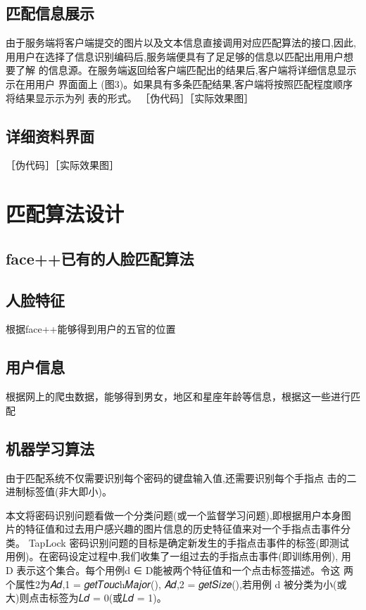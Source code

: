 \subsection{匹配信息展⽰}
由于服务端将客户端提交的图片以及文本信息直接调用对应匹配算法的接口,因此, ⽤用户在选择了信息识别编码后,服务端便具有了⾜足够的信息以匹配出⽤用户想要了解 的信息源。在服务端返回给客户端匹配出的结果后,客户端将详细信息显⽰示在⽤用户 界⾯面上 (图3)。如果具有多条匹配结果,客户端将按照匹配程度顺序将结果显⽰示为列 表的形式。
［伪代码］［实际效果图］
\subsection{详细资料界面}
［伪代码］［实际效果图］


\section{}

\section{匹配算法设计}
\subsection{face++已有的人脸匹配算法}
\subsection{人脸特征}
根据face++能够得到用户的五官的位置
\subsection{用户信息}
根据网上的爬虫数据，能够得到男女，地区和星座年龄等信息，根据这一些进行匹配
\subsection{机器学习算法}
由于匹配系统不仅需要识别每个密码的键盘输入值,还需要识别每个手指点 击的二进制标签值(非大即小)。

本文将密码识别问题看做一个分类问题(或一个监督学习问题),即根据用户本身图片的特征值和过去用户感兴趣的图片信息的历史特征值来对一个手指点击事件分类。
TapLock 密码识别问题的目标是确定新发生的手指点击事件的标签(即测试 用例)。在密码设定过程中,我们收集了一组过去的手指点击事件(即训练用例), 用 D 表示这个集合。每个用例d ∈ D能被两个特征值和一个点击标签描述。令这 两个属性2为𝐴𝑑,1 = 𝑔𝑒𝑡𝑇𝑜𝑢𝑐h𝑀𝑎𝑗𝑜𝑟(), 𝐴𝑑,2 = 𝑔𝑒𝑡𝑆𝑖𝑧𝑒(),若用例 d 被分类为小(或 大)则点击标签为𝐿𝑑 = 0(或𝐿𝑑 = 1)。





